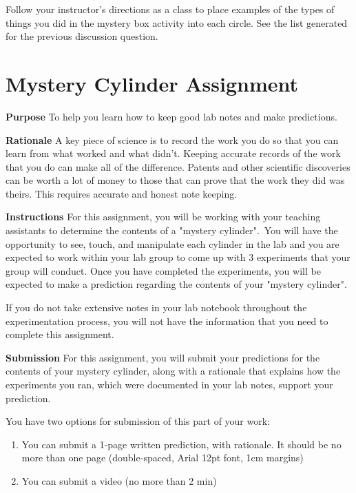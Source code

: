 \documentclass[
]{book}
\providecommand{\tightlist}{%
  \setlength{\itemsep}{0pt}\setlength{\parskip}{0pt}}
\begin{document}
Follow your instructor's directions as a class to place examples of the types of things you did in the mystery box activity into each circle. See the list generated for the previous discussion question.

\hypertarget{mystery-cylinder-assignment}{%
\section*{Mystery Cylinder Assignment}\label{mystery-cylinder-assignment}}

\textbf{Purpose} To help you learn how to keep good lab notes and make predictions.

\textbf{Rationale} A key piece of science is to record the work you do so that you can learn from what worked and what didn't. Keeping accurate records of the work that you do can make all of the difference. Patents and other scientific discoveries can be worth a lot of money to those that can prove that the work they did was theirs. This requires accurate and honest note keeping.

\textbf{Instructions} For this assignment, you will be working with your teaching assistants to determine the contents of a "mystery cylinder".\, You will have the opportunity to see, touch, and manipulate each cylinder in the lab and you are expected to work within your lab group to come up with 3 experiments that your group will conduct. Once you have completed the experiments, you will be expected to make a prediction regarding the contents of your "mystery cylinder".

If you do not take extensive notes in your lab notebook throughout the experimentation process, you will not have the information that you need to complete this assignment. \,

\textbf{Submission} For this assignment, you will submit your predictions for the contents of your mystery cylinder, along with a rationale that explains how the experiments you ran, which were documented in your lab notes, support your prediction.

You have two options for submission of this part of your work:

\begin{enumerate}
\def\labelenumi{\arabic{enumi}.}
\tightlist
\item
  You can submit a 1-page written prediction, with rationale. It should be no more than one page (double-spaced, Arial 12pt font, 1cm margins)
\item
  You can submit a video (no more than 2 min)
\end{enumerate}
\end{document}
